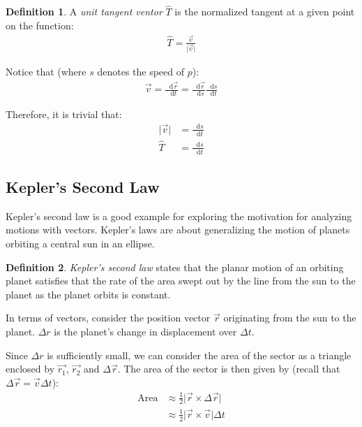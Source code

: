 \documentclass[12pt]{article}
\newcommand{\mo}[1]{\lvert #1 \rvert}
\newcommand*\diff{\mathop{}\!\mathrm{d}}
\theoremstyle{definition}
\newtheorem{defn}{Definition}[section]
\begin{document}
	\begin{defn}
		A \emph{unit tangent ventor} $\hat{T}$ is the normalized tangent at a given point on the function:
		\begin{gather*}
			\hat{T} = \frac{\vec{v}}{\mo{\vec{v}}}
		\end{gather*}
	\end{defn}
	
	Notice that (where $s$ denotes the speed of $p$):
	\begin{gather*}
		\vec{v} = \frac{\diff \vec{r}}{\diff t} = \frac{\diff \vec{r}}{\diff s}\frac{\diff s}{\diff t}
	\end{gather*}
	
	Therefore, it is trivial that:
	\begin{align*}
		\mo{\vec{v}} &= \frac{\diff s}{\diff t} \\
		\hat{T} &= \frac{\diff s}{\diff t}
	\end{align*}
	
	\subsection{Kepler's Second Law}
	
	Kepler's second law is a good example for exploring the motivation for analyzing motions with vectors. Kepler's laws are about generalizing the motion of planets orbiting a central sun in an ellipse.
	
	\begin{defn}
		\emph{Kepler's second law} states that the planar motion of an orbiting planet satisfies that the rate of the area swept out by the line from the sun to the planet as the planet orbits is constant. 
	\end{defn}
	
	In terms of vectors, consider the position vector $\vec{r}$ originating from the sun to the planet. $\Delta r$ is the planet's change in displacement over $\Delta t$.
	
	Since $\Delta r$ is sufficiently small, we can consider the area of the sector as a triangle enclosed by $\vec{r_1}$, $\vec{r_2}$ and $\Delta \vec{r}$. The area of the sector is then given by (recall that $\Delta \vec{r} = \vec{v} \Delta t$):
	\begin{align*}
		\text{Area} &\approx \frac{1}{2} \mo{\vec{r} \times \Delta \vec{r}} \\
		& \approx \frac{1}{2} \mo{\vec{r} \times \vec{v}} \Delta t
	\end{align*}
	
\end{document}
